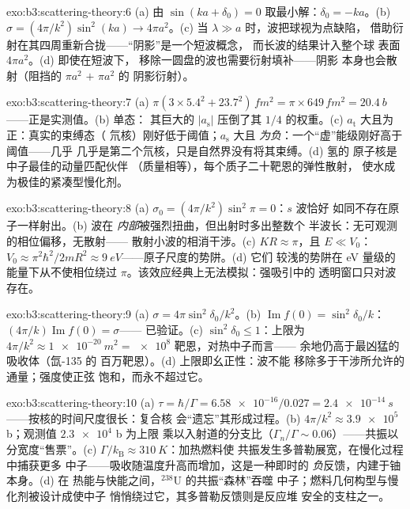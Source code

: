 \begin{solution}{exo:b3:scattering-theory:6}
(a) 由 $\sin(ka + \delta_0) = 0$ 取最小解：$\delta_0
= -ka$。(b) $\sigma = (4\pi/k^2)\sin^2(ka) \to 4\pi a^2$。(c) 当
$\lambda \gg a$ 时，波把球视为点缺陷，
借助衍射在其四周重新合拢——“阴影”是一个短波概念，
而长波的结果计入整个球
表面 $4\pi a^2$。(d) 即使在短波下，
移除一圆盘的波也需要衍射填补——阴影
本身也会散射（阻挡的 $\pi a^2$ $+$ $\pi a^2$ 的
阴影衍射）。
\end{solution}

\begin{solution}{exo:b3:scattering-theory:7}
(a) $\pi(3 \times 5.4^2 + 23.7^2)\,\unit{fm^2} = \pi \times 649
\,\unit{fm^2} = \qty{20.4}{b}$——正是实测值。(b) 单态：
其巨大的 $|a_{\text{s}}|$ 压倒了其 $1/4$ 的权重。(c)
$a_{\text{t}}$ 大且为正：真实的束缚态（
氘核）刚好低于阈值；$a_{\text{s}}$ 大且
\emph{为负}：一个“虚”能级刚好高于阈值——几乎
几乎是第二个氘核，只是自然界没有将其束缚。(d) 氢的
原子核是中子最佳的动量匹配伙伴
（质量相等），每个质子二十靶恩的弹性散射，
使水成为极佳的紧凑型慢化剂。
\end{solution}

\begin{solution}{exo:b3:scattering-theory:8}
(a) $\sigma_0 = (4\pi/k^2)\sin^2\pi = 0$：$s$ 波恰好
如同不存在原子一样射出。(b) 波在
\emph{内部}被强烈扭曲，但出射时多出整数个
半波长：无可观测的相位偏移，无散射——
散射小波的相消干涉。(c) $KR
\approx \pi$，且 $E \ll V_0$：$V_0 \approx \pi^2\hbar^2/2mR^2
\approx \qty{9}{eV}$——原子尺度的势阱。(d) 它们
较浅的势阱在 eV 量级的
能量下从不使相位绕过 $\pi$。该效应经典上无法模拟：强吸引中的
透明窗口只对波存在。
\end{solution}

\begin{solution}{exo:b3:scattering-theory:9}
(a) $\sigma = 4\pi\sin^2\delta_0/k^2$。(b) $\operatorname{Im}f(0)
= \sin^2\delta_0/k$：$(4\pi/k)\operatorname{Im}f(0) = \sigma$——
已验证。(c) $\sin^2\delta_0 \le 1$：上限为 $4\pi/k^2 \approx
\qty{1e-20}{m^2} = \num{e8}$ 靶恩，对热中子而言——
余地仍高于最凶猛的吸收体（氙-135 的
百万靶恩）。(d) 上限即幺正性：波不能
移除多于干涉所允许的通量；强度使正弦
饱和，而永不超过它。
\end{solution}

\begin{solution}{exo:b3:scattering-theory:10}
(a) $\tau = \hbar/\Gamma = \num{6.58e-16}/0.027 =
\qty{2.4e-14}{s}$——按核的时间尺度很长：复合核
会“遗忘”其形成过程。(b) $4\pi/k^2 \approx
\num{3.9e5}$ b；观测值 $\num{2.3e4}$ b 为上限
乘以入射道的分支比（$\Gamma_n/\Gamma
\sim 0.06$）——共振以分宽度“售票”。(c)
$\Gamma/k_{\text{B}} \approx \qty{310}{K}$：加热燃料使
共振发生多普勒展宽，在慢化过程中捕获更多
中子——吸收随温度升高而增加，这是一种即时的
\emph{负}反馈，内建于铀本身。(d) 在
热能与快能之间，$^{238}$U 的共振“森林”吞噬
中子；燃料几何构型与慢化剂被设计成使中子
悄悄绕过它，其多普勒反馈则是反应堆
安全的支柱之一。
\end{solution}

